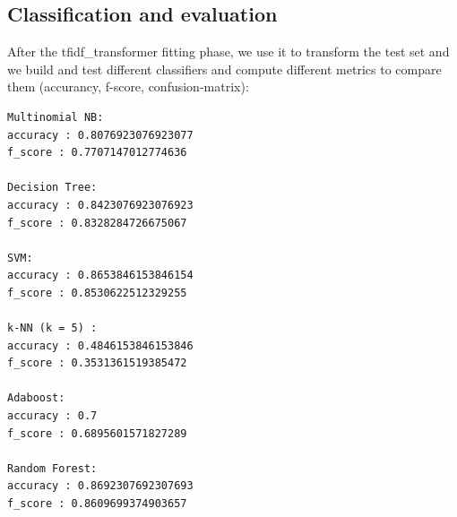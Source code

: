 \documentclass[a4paper]{article}
\begin{document}
\subsection{Classification and evaluation}
After the tfidf\_transformer fitting phase, we use it to transform the test set and we build and test different classifiers and compute different metrics to compare them (accurancy, f-score, confusion-matrix):
\begin{verbatim}
Multinomial NB:
accuracy : 0.8076923076923077
f_score : 0.7707147012774636

Decision Tree:
accuracy : 0.8423076923076923
f_score : 0.8328284726675067

SVM:
accuracy : 0.8653846153846154
f_score : 0.8530622512329255

k-NN (k = 5) :
accuracy : 0.4846153846153846
f_score : 0.3531361519385472

Adaboost:
accuracy : 0.7
f_score : 0.6895601571827289

Random Forest:
accuracy : 0.8692307692307693
f_score : 0.8609699374903657
\end{verbatim}
\end{document}
